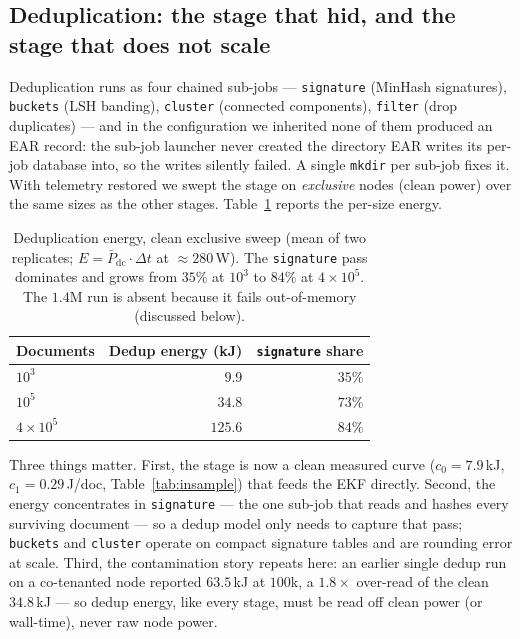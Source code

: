 \documentclass{article}
\begin{document}
\subsection{Deduplication: the stage that hid, and the stage that does not scale}

\label{sec:results-dedup}

Deduplication runs as four chained sub-jobs --- \texttt{signature} (MinHash signatures), \texttt{buckets} (LSH banding), \texttt{cluster} (connected components), \texttt{filter} (drop duplicates) --- and in the configuration we inherited none of them produced an EAR record: the sub-job launcher never created the directory EAR writes its per-job database into, so the writes silently failed. A single \texttt{mkdir} per sub-job fixes it. With telemetry restored we swept the stage on \emph{exclusive} nodes (clean power) over the same sizes as the other stages. Table~\ref{tab:dedup} reports the per-size energy.

\begin{table}[ht]
  \centering
  \begin{tabular}{lrr}
    \toprule
    Documents & Dedup energy (kJ) & \texttt{signature} share \\
    \midrule
    $10^3$            & $\phantom{00}9.9$ & $35\%$ \\
    $10^5$            & $34.8$            & $73\%$ \\
    $4{\times}10^5$   & $125.6$           & $84\%$ \\
    \bottomrule
  \end{tabular}
  \caption{Deduplication energy, clean exclusive sweep (mean of two replicates; $E = \bar{P}_{\mathrm{dc}}\cdot\Delta t$ at ${\approx}280$\,W). The \texttt{signature} pass dominates and grows from $35\%$ at $10^3$ to $84\%$ at $4{\times}10^5$. The $1.4$M run is absent because it fails out-of-memory (discussed below).}
  \label{tab:dedup}
\end{table}

Three things matter. First, the stage is now a clean measured curve ($c_0=7.9$\,kJ, $c_1=0.29$\,J/doc, Table~\ref{tab:insample}) that feeds the EKF directly. Second, the energy concentrates in \texttt{signature} --- the one sub-job that reads and hashes every surviving document --- so a dedup model only needs to capture that pass; \texttt{buckets} and \texttt{cluster} operate on compact signature tables and are rounding error at scale. Third, the contamination story repeats here: an earlier single dedup run on a co-tenanted node reported $63.5$\,kJ at $100$k, a $1.8\times$ over-read of the clean $34.8$\,kJ --- so dedup energy, like every stage, must be read off clean power (or wall-time), never raw node power.
\end{document}
